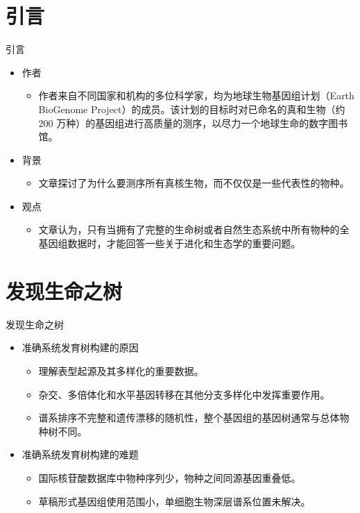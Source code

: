 \documentclass{beamer}
\begin{document}
	\section*{引言}
	\begin{frame}{引言}
		\begin{itemize}
			\item 作者
			\begin{itemize}
				\item 作者来自不同国家和机构的多位科学家，均为地球生物基因组计划（Earth BioGenome Project）的成员。该计划的目标时对已命名的真和生物（约 200 万种）的基因组进行高质量的测序，以尽力一个地球生命的数字图书馆。
			\end{itemize}
			\item 背景
			\begin{itemize}
				\item 文章探讨了为什么要测序所有真核生物，而不仅仅是一些代表性的物种。
			\end{itemize}
			\item 观点
			\begin{itemize}
				\item 文章认为，只有当拥有了完整的生命树或者自然生态系统中所有物种的全基因组数据时，才能回答一些关于进化和生态学的重要问题。
			\end{itemize}
		\end{itemize}
	\end{frame}


	\section{发现生命之树}
	\begin{frame}{发现生命之树}
		\begin{itemize}
			\item 准确系统发育树构建的原因
			\begin{itemize}
			\item 理解表型起源及其多样化的重要数据。
			\item 杂交、多倍体化和水平基因转移在其他分支多样化中发挥重要作用。
			\item 谱系排序不完整和遗传漂移的随机性，整个基因组的基因树通常与总体物种树不同。
			\end{itemize}

			\item 准确系统发育树构建的难题
			\begin{itemize}
			\item 国际核苷酸数据库中物种序列少，物种之间同源基因重叠低。
			\item 草稿形式基因组使用范围小，单细胞生物深层谱系位置未解决。
			\end{itemize}
		\end{itemize}

	\end{frame}
\end{document}
